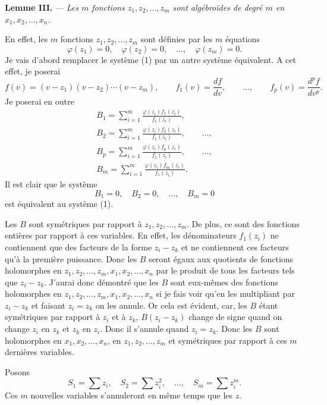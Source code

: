 \documentclass[11pt]{article}
\begin{document}
\medskip
\noindent\textbf{Lemme III.} — \emph{Les $m$ fonctions $z_1,z_2,\ldots,z_m$ sont algébroïdes de degré $m$ en $x_1,x_2,\ldots,x_n$.}

En effet, les $m$ fonctions $z_1,z_2,\ldots,z_m$ sont définies par les $m$ équations
\begin{equation*}\tag{1}
\varphi(z_1)=0,
\quad \varphi(z_2)=0,
\quad \ldots,
\quad \varphi(z_m)=0.
\end{equation*}
Je vais d'abord remplacer le système (1) par un autre système équivalent. A cet effet, je poserai
\[
f(v)=(v-z_1)(v-z_2)\cdots(v-z_m),
\qquad
f_1(v)=\frac{df}{dv},
\qquad \ldots,
\qquad
f_p(v)=\frac{d^p f}{dv^p}.
\]
Je poserai en outre
\[
\begin{gathered}
B_1=\sum_{i=1}^m \frac{\varphi(z_i)f_1(z_i)}{f_1(z_i)},\\
B_2=\sum_{i=1}^m \frac{\varphi(z_i)f_2(z_i)}{f_1(z_i)},\qquad \ldots,\\
B_p=\sum_{i=1}^m \frac{\varphi(z_i)f_p(z_i)}{f_1(z_i)},\qquad \ldots,\\
B_m=\sum_{i=1}^m \frac{\varphi(z_i)f_m(z_i)}{f_1(z_i)}.
\end{gathered}
\]
Il est clair que le système
\begin{equation*}\tag{2}
B_1=0,
\quad B_2=0,
\quad \ldots,
\quad B_m=0
\end{equation*}
est équivalent au système (1).

Les $B$ sont symétriques par rapport à $z_1,z_2,\ldots,z_m$. De plus, ce sont des fonctions entières par rapport à ces variables. En effet, les dénominateurs $f_1(z_i)$ ne contiennent que des facteurs de la forme $z_i-z_k$ et ne contiennent ces facteurs qu'à la première puissance. Donc les $B$ seront égaux aux quotients de fonctions holomorphes en $z_1,z_2,\ldots,z_m,x_1,x_2,\ldots,x_n$ par le produit de tous les facteurs tels que $z_i-z_k$. J'aurai donc démontré que les $B$ sont eux-mêmes des fonctions holomorphes en $z_1,z_2,\ldots,z_m,x_1,x_2,\ldots,x_n$ si je fais voir qu'en les multipliant par $z_i-z_k$ et faisant $z_i=z_k$ on les annule. Or cela est évident, car, les $B$ étant symétriques par rapport à $z_i$ et à $z_k$, $B(z_i-z_k)$ change de signe quand on change $z_i$ en $z_k$ et $z_k$ en $z_i$. Donc il s'annule quand $z_i=z_k$. Donc les $B$ sont holomorphes en $x_1,x_2,\ldots,x_n$, en $z_1,z_2,\ldots,z_m$ et symétriques par rapport à ces $m$ dernières variables.

Posons
\[
S_1=\sum z_i,
\quad S_2=\sum z_i^2,
\quad \ldots,
\quad S_m=\sum z_i^m.
\]
Ces $m$ nouvelles variables s'annuleront en même temps que les $z$.
\end{document}
